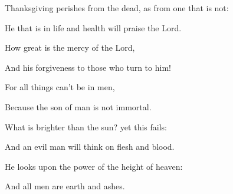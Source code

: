 {\par }{\Q {}Thanksgiving perishes from the dead, as from one that is not:
\par }{\Q He that is in life and health will praise the Lord.
\par }{\Q {}How great is the mercy of the Lord,
\par }{\Q And his forgiveness to those who turn to him!
\par }{\Q {}For all things can’t be in men,
\par }{\Q Because the son of man is not immortal.
\par }{\Q {}What is brighter than the sun? yet this fails:
\par }{\Q And an evil man will think on flesh and blood.
\par }{\Q {}He looks upon the power of the height of heaven:
\par }{\Q And all men are earth and ashes.
\par }{\BB \par }
